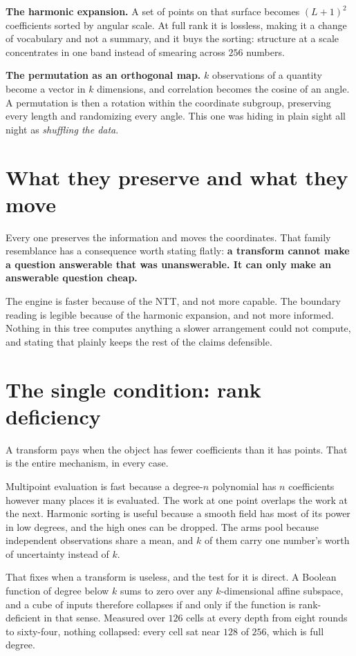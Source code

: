 \textbf{The harmonic expansion.} A set of points on that surface becomes \((L+1)^2\) coefficients sorted by angular scale. At full rank it is lossless, making it a change of vocabulary and not a summary, and it buys the sorting: structure at a scale concentrates in one band instead of smearing across \(256\) numbers.

\textbf{The permutation as an orthogonal map.} \(k\) observations of a quantity become a vector in \(k\) dimensions, and correlation becomes the cosine of an angle. A permutation is then a rotation within the coordinate subgroup, preserving every length and randomizing every angle. This one was hiding in plain sight all night as \emph{shuffling the data}.

\section{What they preserve and what they move}

Every one preserves the information and moves the coordinates. That family resemblance has a consequence worth stating flatly: \textbf{a transform cannot make a question answerable that was unanswerable. It can only make an answerable question cheap.}

The engine is faster because of the NTT, and not more capable. The boundary reading is legible because of the harmonic expansion, and not more informed. Nothing in this tree computes anything a slower arrangement could not compute, and stating that plainly keeps the rest of the claims defensible.

\section{The single condition: rank deficiency}

A transform pays when the object has fewer coefficients than it has points. That is the entire mechanism, in every case.

Multipoint evaluation is fast because a degree-\(n\) polynomial has \(n\) coefficients however many places it is evaluated. The work at one point overlaps the work at the next. Harmonic sorting is useful because a smooth field has most of its power in low degrees, and the high ones can be dropped. The arms pool because independent observations share a mean, and \(k\) of them carry one number's worth of uncertainty instead of \(k\).

That fixes when a transform is useless, and the test for it is direct. A Boolean function of degree below \(k\) sums to zero over any \(k\)-dimensional affine subspace, and a cube of inputs therefore collapses if and only if the function is rank-deficient in that sense. Measured over \(126\) cells at every depth from eight rounds to sixty-four, nothing collapsed: every cell sat near \(128\) of \(256\), which is full degree.

